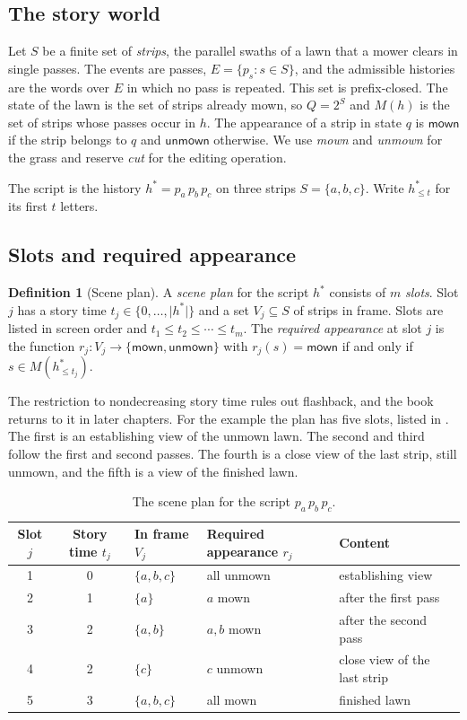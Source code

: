 \documentclass[11pt,twoside,openright]{book}
\theoremstyle{plain}
\theoremstyle{definition}
\newtheorem{definition}[theorem]{Definition}
\theoremstyle{remark}
\newcommand{\mown}{\mathsf{mown}}
\newcommand{\unmown}{\mathsf{unmown}}
\begin{document}
\subsection{The story world}

Let $S$ be a finite set of \emph{strips}, the parallel swaths of a lawn that a mower clears in single passes. The events are passes, $E=\{p_s:s\in S\}$, and the admissible histories are the words over $E$ in which no pass is repeated. This set is prefix-closed. The state of the lawn is the set of strips already mown, so $Q=2^S$ and $M(h)$ is the set of strips whose passes occur in $h$. The appearance of a strip in state $q$ is $\mown$ if the strip belongs to $q$ and $\unmown$ otherwise. We use \emph{mown} and \emph{unmown} for the grass and reserve \emph{cut} for the editing operation.

The script is the history $h^\ast=p_a\,p_b\,p_c$ on three strips $S=\{a,b,c\}$. Write $h^\ast_{\le t}$ for its first $t$ letters.

\subsection{Slots and required appearance}

\begin{definition}[Scene plan]\label{def:plan}
A \emph{scene plan} for the script $h^\ast$ consists of $m$ \emph{slots}. Slot $j$ has a story time $t_j\in\{0,\dots,\lvert h^\ast\rvert\}$ and a set $V_j\subseteq S$ of strips in frame. Slots are listed in screen order and $t_1\le t_2\le\cdots\le t_m$. The \emph{required appearance} at slot $j$ is the function $r_j:V_j\to\{\mown,\unmown\}$ with $r_j(s)=\mown$ if and only if $s\in M(h^\ast_{\le t_j})$.
\end{definition}

The restriction to nondecreasing story time rules out flashback, and the book returns to it in later chapters. For the example the plan has five slots, listed in . The first is an establishing view of the unmown lawn. The second and third follow the first and second passes. The fourth is a close view of the last strip, still unmown, and the fifth is a view of the finished lawn.

\begin{table}[ht]
\centering
\begin{tabular}{@{}cclll@{}}
\toprule
Slot $j$ & Story time $t_j$ & In frame $V_j$ & Required appearance $r_j$ & Content \\
\midrule
1 & 0 & $\{a,b,c\}$ & all unmown & establishing view \\
2 & 1 & $\{a\}$ & $a$ mown & after the first pass \\
3 & 2 & $\{a,b\}$ & $a,b$ mown & after the second pass \\
4 & 2 & $\{c\}$ & $c$ unmown & close view of the last strip \\
5 & 3 & $\{a,b,c\}$ & all mown & finished lawn \\
\bottomrule
\end{tabular}
\caption{The scene plan for the script $p_a\,p_b\,p_c$.}\label{tab:plan}
\end{table}
\end{document}
